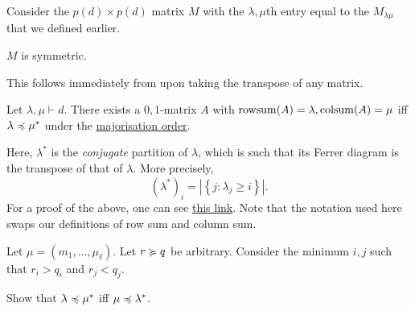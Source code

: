 	Consider the $p(d) \times p(d)$ matrix $M$ with the ${\lambda,\mu}$th entry equal to the $M_{\lambda\mu}$ that we defined earlier.
	
	\begin{fcor}
		$M$ is symmetric.
	\end{fcor}
	This follows immediately from  upon taking the transpose of any matrix.

	\begin{ftheo}
		\label{gale-ryser}
		Let $\lambda,\mu \vdash d$. There exists a $0,1$-matrix $A$ with $\operatorname{rowsum}(A) = \lambda,\operatorname{colsum}(A) = \mu$ iff $\lambda \preccurlyeq \mu^*$ under the \hyperref[def: majorisation order]{majorisation order}.
	\end{ftheo}

	Here, $\lambda^*$ is the \emph{conjugate} partition of $\lambda$, which is such that its Ferrer diagram is the transpose of that of $\lambda$. More precisely,
	\[ (\lambda^*)_i = \left| \left\{ j : \lambda_j \ge i \right\} \right|. \]
	For a proof of the above, one can see \href{http://www.math.iitb.ac.in/~krishnan/phd-2022/krause_gale_ryser.pdf}{this link}. Note that the notation used here swaps our definitions of row sum and column sum. %

		Let $\mu = (m_1,\ldots,\mu_\ell)$. Let $r \succcurlyeq q$ be arbitrary. Consider the minimum $i,j$ such that $r_i > q_i$ and $r_j < q_j$. %

	\begin{exercise}
		Show that $\lambda \preccurlyeq \mu^*$ iff $\mu \preccurlyeq \lambda^*$.
	\end{exercise}
	
